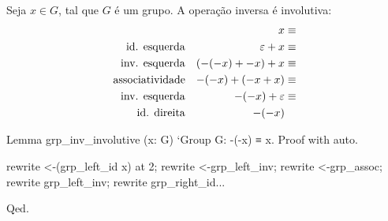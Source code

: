 \vspace*{.4em}\\
\begin{minipage}[t]{0.5\linewidth}
\begin{corolario}
Seja $x \in G$, tal que $G$ é um grupo. A operação inversa é involutiva:
\begin{align*}
                               & & x& \equiv\\
   \text{\textup{id. esquerda}}& & \varepsilon + x& \equiv\\
   \text{\textup{inv. esquerda}}& & (-(-x) + -x) + x& \equiv\\
   \text{\textup{associatividade}}& & -(-x) + (-x + x)& \equiv\\
   \text{\textup{inv. esquerda}}& & -(-x) + \varepsilon& \equiv\\
   \text{\textup{id. direita}}& & -(-x) &
\end{align*}
\end{corolario}
\end{minipage}
\hspace{1em}
\begin{minipage}[t]{0.5\linewidth}
\begin{coqcode}
Lemma grp_inv_involutive
  (x: G) `{Group G}: -(-x) ≡ x.
Proof with auto.


rewrite <-(grp_left_id x) at 2;
rewrite <-grp_left_inv;
rewrite <-grp_assoc;
rewrite grp_left_inv;
rewrite grp_right_id...

Qed.
\end{coqcode}
\end{minipage}


